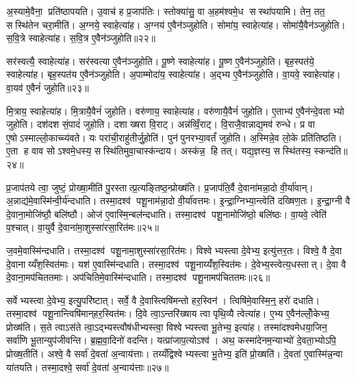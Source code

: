 अ॒स्यामे॒वैना॒ प्रति॑ष्ठापयति। उ॒वाच॑ ह प्र॒जाप॑तिः। स्तोक्या॑सु॒ वा अ॒हम॑श्वमे॒ध सस्था॑पयामि। तेन॒ तत॒ सस्थि॑तेन चरा॒मीति॑। अ॒ग्नये॒ स्वाहेत्या॑ह। अ॒ग्नय॑ ए॒वैन॑ञ्जुहोति। सोमा॑य॒ स्वाहेत्या॑ह। सोमा॑यै॒वैन॑ञ्जुहोति। स॒वि॒त्रे स्वाहेत्या॑ह। स॒वि॒त्र ए॒वैन॑ञ्जुहोति॥२२॥

सर॑स्वत्यै॒ स्वाहेत्या॑ह। सर॑स्वत्या ए॒वैन॑ञ्जुहोति। पू॒ष्णे स्वाहेत्या॑ह। पू॒ष्ण ए॒वैन॑ञ्जुहोति। बृह॒स्पत॑ये॒ स्वाहेत्या॑ह। बृह॒स्पत॑य ए॒वैन॑ञ्जुहोति। अ॒पाम्मोदा॑य॒ स्वाहेत्या॑ह। अ॒द्भ्य ए॒वैन॑ञ्जुहोति। वा॒यवे॒ स्वाहेत्या॑ह। वा॒यव॑ ए॒वैनं॑ जुहोति॥२३॥

मि॒त्राय॒ स्वाहेत्या॑ह। मि॒त्रायै॒वैनं॑ जुहोति। वरु॑णाय॒ स्वाहेत्या॑ह। वरु॑णायै॒वैनं॑ जुहोति। ए॒ताभ्य॑ ए॒वैन॑न्दे॒वताभ्यो जुहोति। दश॑दश सं॒पादं॑ जुहोति। दशाख्षरा वि॒राट्। अन्न॑व्विँ॒राट्। वि॒राजै॒वान्नाद्य॒मव॑ रुन्धे। प्र वा ए॒षोऽस्माल्लो॒काच्च्य॑वते। यः परा॑ची॒राहु॑तीर्जु॒होति॑। पुन॑पुनरभ्या॒वर्तं॑ जुहोति। अ॒स्मिन्ने॒व लो॒के प्रति॑तिष्ठति। ए॒ता ह वाव सोऽश्वमे॒धस्य॒ सस्थि॑तिमुवा॒चास्क॑न्दाय। अस्क॑न्न॒ हि तत्। यद्य॒ज्ञस्य॒ सस्थि॑तस्य॒ स्कन्द॑ति॥२४॥\anuvakamend[अ॒भिजि॑त्यै वैश्वान॒रस्स॑वि॒त्र ए॒वैनं॑ जुहोति वा॒यव॑ ए॒वैनं॑ जुहोति च्यवते॒ षट् च॑]

प्र॒जाप॑तये त्वा॒ जुष्टं॒ प्रोख्षा॒मीति॑ पु॒रस्तात्प्र॒त्यङ्तिष्ठ॒न्प्रोख्ष॑ति। प्र॒जाप॑ति॒र्वै दे॒वाना॑मन्ना॒दो वी॒र्या॑वान्। अ॒न्नाद्य॑मे॒वास्मि॑न्वी॒र्य॑न्दधाति। तस्मा॒दश्व॑ पशू॒नाम॑न्ना॒दो वी॒र्या॑वत्तमः। इ॒न्द्रा॒ग्निभ्या॒न्त्वेति॑ दख्षिण॒तः। इ॒न्द्रा॒ग्नी वै दे॒वाना॒मोजि॑ष्ठौ॒ बलि॑ष्ठौ। ओज॑ ए॒वास्मि॒न्बल॑न्दधाति। तस्मा॒दश्व॑ पशू॒नामोजि॑ष्ठो॒ बलि॑ष्ठः। वा॒यवे॒ त्वेति॑ प॒श्चात्। वा॒युर्वै दे॒वाना॑मा॒शुस्सा॑रसा॒रित॑मः॥२५॥

ज॒वमे॒वास्मि॑न्दधाति। तस्मा॒दश्व॑ पशू॒नामा॒शुस्सा॑रसा॒रित॑मः। विश्वेभ्यस्त्वा दे॒वेभ्य॒ इत्यु॑त्तर॒तः। विश्वे॒ वै दे॒वा दे॒वानाय्यँश॒स्वित॑माः। यश॑ ए॒वास्मि॑न्दधाति। तस्मा॒दश्व॑ पशू॒नाय्यँ॑श॒स्वित॑मः। दे॒वेभ्य॒स्त्वेत्य॒धस्तात्। दे॒वा वै दे॒वाना॒मप॑चिततमाः। अप॑चितिमे॒वास्मि॑न्दधाति। तस्मा॒दश्व॑ पशू॒नामप॑चिततमः॥२६॥

सर्वेभ्यस्त्वा दे॒वेभ्य॒ इत्यु॒परि॑ष्टात्। सर्वे॒ वै दे॒वास्त्विषि॑मन्तो हर॒स्विन॑। त्विषि॑मे॒वास्मि॒न्॒ हरो॑ दधाति। तस्मा॒दश्व॑ पशू॒नान्त्विषि॑मान्‌हर॒स्वित॑मः। दि॒वे त्वा॒ऽन्तरि॑ख्षाय त्वा पृथि॒व्यै त्वेत्या॑ह। ए॒भ्य ए॒वैन॑ल्लोँ॒केभ्य॒ प्रोख्ष॑ति। स॒ते त्वाऽस॑ते त्वा॒ऽद्भ्यस्त्वौष॑धीभ्यस्त्वा॒ विश्वेभ्यस्त्वा भू॒तेभ्य॒ इत्या॑ह। तस्मा॑दश्वमेधया॒जिन॒ सर्वा॑णि भू॒तान्युप॑जीवन्ति। ब्र॒ह्म॒वा॒दिनो॑ वदन्ति। यत्प्रा॑जाप॒त्योऽश्व॑। अथ॒ कस्मा॑देनम॒न्याभ्यो॑ दे॒वता॒भ्योऽपि॒ प्रोख्ष॒तीति॑। अश्वे॒ वै सर्वा॑ दे॒वता॑ अ॒न्वाय॑त्ताः। तय्यँद्विश्वेभ्यस्त्वा भू॒तेभ्य॒ इति॑ प्रो॒ख्षति॑। दे॒वता॑ ए॒वास्मि॑न्न॒न्वा या॑तयति। तस्मा॒दश्वे॒ सर्वा॑ दे॒वता॑ अ॒न्वाय॑त्ताः॥२७॥\anuvakamend[सा॒र॒सा॒रित॒मोऽप॑चिततमः प्राजाप॒त्योऽश्व॒ पञ्च॑ च]


